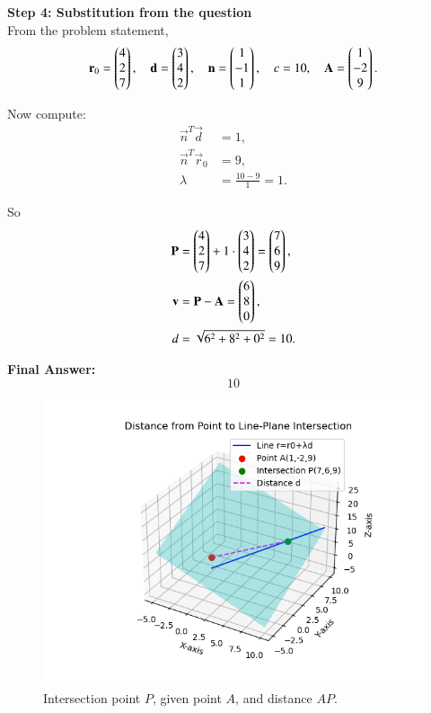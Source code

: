 \documentclass[journal]{IEEEtran}
\begin{document}
\textbf{Step 4: Substitution from the question} \\
From the problem statement,
\begin{align}
    \mathbf{r}_0 = \begin{pmatrix}4 \\ 2 \\ 7\end{pmatrix}, \quad
    \mathbf{d} = \begin{pmatrix}3 \\ 4 \\ 2\end{pmatrix}, \quad
    \mathbf{n} = \begin{pmatrix}1 \\ -1 \\ 1\end{pmatrix}, \quad
    c = 10, \quad
    \mathbf{A} = \begin{pmatrix}1 \\ -2 \\ 9\end{pmatrix}.
\end{align}

Now compute:
\begin{align}
    \vec{n}^T\vec{d} &= 1, \\
    \vec{n}^T\vec{r}_0 &= 9, \\
    \lambda &= \frac{10 - 9}{1} = 1.
\end{align}

So
\begin{align}
    \mathbf{P} &= \begin{pmatrix}4 \\ 2 \\ 7\end{pmatrix} + 1 \cdot \begin{pmatrix}3 \\ 4 \\ 2\end{pmatrix} = \begin{pmatrix}7 \\ 6 \\ 9\end{pmatrix}, \\
    \mathbf{v} &= \mathbf{P} - \mathbf{A} = \begin{pmatrix}6 \\ 8 \\ 0\end{pmatrix}, \\
    d &= \sqrt{6^2 + 8^2 + 0^2} = 10.
\end{align}

\textbf{Final Answer: }
\[
\boxed{10}
\]

\pagebreak
\begin{figure}[H]
    \centering
    \includegraphics[width=0.7\columnwidth]{figs/Figure_1.png}
    \caption{Intersection point $P$, given point $A$, and distance $AP$.}
    \label{fig:fig1}
\end{figure}
\end{document}
